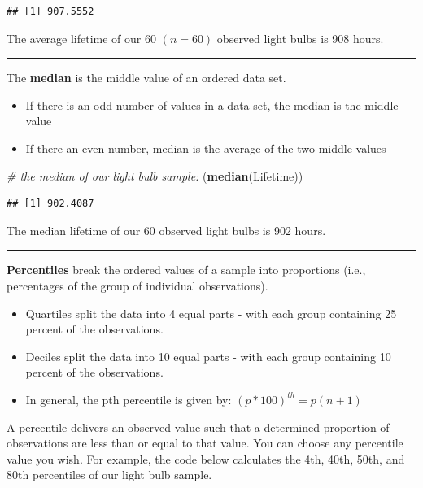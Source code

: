 \documentclass[
]{book}
\newenvironment{Shaded}{\begin{snugshade}}{\end{snugshade}}
\newcommand{\CommentTok}[1]{\textcolor[rgb]{0.56,0.35,0.01}{\textit{#1}}}
\newcommand{\FunctionTok}[1]{\textcolor[rgb]{0.13,0.29,0.53}{\textbf{#1}}}
\newcommand{\NormalTok}[1]{#1}
\begin{document}
\begin{verbatim}
## [1] 907.5552
\end{verbatim}

The average lifetime of our 60 \((n=60)\) observed light bulbs is 908 hours.

\begin{center}\rule{0.5\linewidth}{0.5pt}\end{center}

The \textbf{median} is the middle value of an ordered data set.

\begin{itemize}
\item
  If there is an odd number of values in a data set, the median is the middle value
\item
  If there an even number, median is the average of the two middle values
\end{itemize}

\begin{Shaded}
\begin{Highlighting}[]
\CommentTok{\# the median of our light bulb sample:}
\NormalTok{(}\FunctionTok{median}\NormalTok{(Lifetime))}
\end{Highlighting}
\end{Shaded}

\begin{verbatim}
## [1] 902.4087
\end{verbatim}

The median lifetime of our 60 observed light bulbs is 902 hours.

\begin{center}\rule{0.5\linewidth}{0.5pt}\end{center}

\textbf{Percentiles} break the ordered values of a sample into proportions (i.e., percentages of the group of individual observations).

\begin{itemize}
\item
  Quartiles split the data into 4 equal parts - with each group containing 25 percent of the observations.
\item
  Deciles split the data into 10 equal parts - with each group containing 10 percent of the observations.
\item
  In general, the pth percentile is given by: \((p * 100)^{th}=p(n+1)\)
\end{itemize}

A percentile delivers an observed value such that a determined proportion of observations are less than or equal to that value. You can choose any percentile value you wish. For example, the code below calculates the 4th, 40th, 50th, and 80th percentiles of our light bulb sample.
\end{document}
